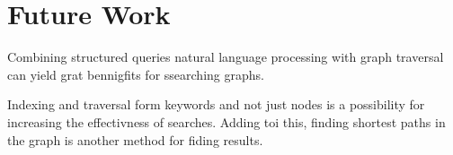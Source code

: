 \section{Future Work}
\label{sec:futureWork}
Combining structured queries natural language processing with graph traversal can yield grat bennigfits for ssearching graphs. 

Indexing and traversal form keywords and not just nodes is a possibility for increasing the effectivness of searches. Adding toi this, finding shortest paths in the graph is another method for fiding results.
